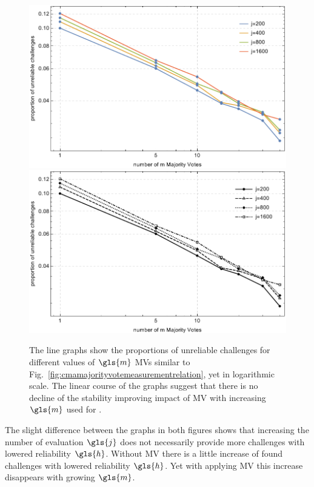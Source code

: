 \begin{figure}[ht]
\ifx{}\undefined
{}
\else
	\if{}
	\centering
	\includegraphics[width=1.00\textwidth]{images/mv-measurements-unstableChallenges_loglog.pdf}
	\else
	\includegraphics[width=1.00\textwidth]{images/mv-measurements-unstableChallenges_loglog_mono.pdf}
	\fi
\fi
\caption[Proportion of unreliable challenges logarithmic]{The line graphs show the proportions of unreliable challenges for different values of $\gls{m}$ \acp{MV} similar to Fig.\ \ref{fig:cmamajorityvotemeasurementrelation}, yet in logarithmic scale. The linear course of the graphs suggest that there is no decline of the stability improving impact of \ac{MV} with increasing $\gls{m}$ used for \mpufs.}
\label{fig:cmamajorityvotemeasurementrelationloglog}
\end{figure}

The slight difference between the graphs in both figures shows that increasing the number of evaluation $\gls{j}$ does not necessarily provide more challenges with lowered reliability $\gls{h}$.
Without \ac{MV} there is a little increase of found challenges with lowered reliability $\gls{h}$.
Yet with applying \ac{MV} this increase disappears with growing $\gls{m}$.

